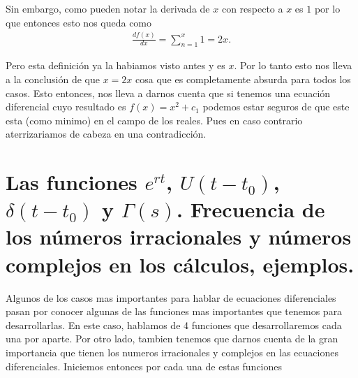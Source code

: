 \documentclass{report}
\begin{document}
Sin embargo, como pueden notar la derivada de $x$ con respecto a $x$ es $1$ por lo que entonces esto nos queda como
\begin{align*}
  \frac{d f\left( x \right) }{dx} = \sum_{n=1}^{x} 1 = 2x
.\end{align*}

Pero esta definición ya la habiamos visto antes y es $x$. Por lo tanto esto nos lleva a la conclusión de que  $x=2x$ cosa que es completamente absurda para todos los casos. Esto entonces, nos lleva a darnos cuenta que si tenemos una ecuación diferencial cuyo resultado es  $f(x)=x^2+c_1$ podemos estar seguros de que este esta (como minimo) en el campo de los reales. Pues en caso contrario aterrizariamos de cabeza en una contradicción.
\chapter{Las funciones $e^{rt}$, $U\left( t-t_0 \right) $, $\delta\left( t-t_0 \right) $ y $\Gamma\left( s \right) $. Frecuencia de los números irracionales y números complejos en los cálculos, ejemplos.}

Algunos de los casos mas importantes para hablar de ecuaciones diferenciales pasan por conocer algunas de las funciones mas importantes que tenemos para desarrollarlas. En este caso, hablamos de 4 funciones que desarrollaremos cada una por aparte. Por otro lado, tambien tenemos que darnos cuenta de la gran importancia que tienen los numeros irracionales y complejos en las ecuaciones diferenciales. Iniciemos entonces por cada una de estas funciones
\end{document}
